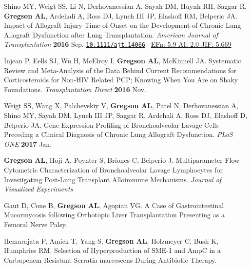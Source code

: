 \documentclass[letterpaper,11pt,sans,dvipsnames,final]{/usr/local/share/texmf-dist/tex/latex/moderncv/moderncv}%
\begin{document}
 \vspace{0.2cm}
 \renewcommand{\refname}{Publications---Research Papers---Peer Reviewed ({\smaller in press})}
 \begin{thebibliography}{1}

\bibitem[1]{} Shino MY, Weigt SS, Li N, Derhovanessian A, Sayah DM, Huynh RH, Saggar R, \textbf{Gregson AL}, Ardehali A, Ross DJ, Lynch III JP, Elashoff RM, Belperio JA. Impact of Allograft Injury Time-of-Onset on the Development of Chronic Lung Allograft Dysfunction after Lung Transplantation. {\color{BrickRed}\textit{American Journal of Transplantation}} \textbf{2016} Sep. \href{http://onlinelibrary.wiley.com/doi/10.1111/ajt.14066/abstract}{\nolinkurl{10.1111/ajt.14066}}~
    {\color{NavyBlue}\href{http://52.6.43.8/projects/journalRank/rankings.php?bsearch=AMERICAN+JOURNAL+OF+TRANSPLANTATION&searchby=journal&orderby=eigenfactor}{{\smaller EFn: 5.9 AI: 2.0 JIF: 5.669}} 
       }

\bibitem[2]{} Injean P, Eells SJ, Wu H, McElroy I, \textbf{Gregson AL}, McKinnell JA. Systematic Review and Meta-Analysis of the Data Behind Current Recommendations for Corticosteroids for Non-HIV Related PCP; Knowing When You Are on Shaky Foundations. {\color{BrickRed}\textit{Transplantation Direct}} \textbf{2016} Nov.

\bibitem[3]{} Weigt SS, Wang X, Palchevskiy V, \textbf{Gregson AL}, Patel N, Derhovanessian A, Shino MY, Sayah DM, Lynch III JP, Saggar R, Ardehali A, Ross DJ, Elashoff D, Belperio JA. Gene Expression Profiling of Bronchoalveolar Lavage Cells Preceding a Clinical Diagnosis of Chronic Lung Allograft Dysfunction. {\color{BrickRed}\textit{PLoS ONE}} \textbf{2017} Jan. 

 \end{thebibliography}

\vspace{0.2cm}
\renewcommand{\refname}{Publications---Research Papers---Peer Reviewed ({\smaller Submitted})}
\begin{thebibliography}{1}
  \bibitem[1]{} \textbf{Gregson AL}, Hoji A, Poynter S, Briones C, Belperio J. Multiparameter Flow Cytometric Characterization of Bronchoalveolar Lavage Lymphocytes for Investigating Post-Lung Transplant Alloimmune Mechanisms. {\color{BrickRed}\textit{Journal of Visualized Experiments}}

  \bibitem[2]{} Gaut D, Cone B, \textbf{Gregson AL}, Agopian VG. A Case of Gastrointestinal Mucormycosis following Orthotopic Liver Transplantation Presenting as a Femoral Nerve Palsy.

  \bibitem[3]{} Hemarajata P, Amick T, Yang S, \textbf{Gregson AL}, Holzmeyer C, Bush K, Humphries RM. Selection of Hyperproduction of SME-1 and AmpC in a Carbapenem-Resistant Serratia marcescens During Antibiotic Therapy. 

\end{thebibliography}
\end{document}
